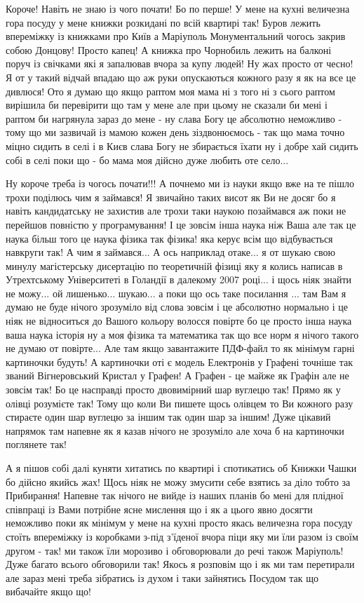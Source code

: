 Короче! Навіть не знаю із чого почати! Бо по перше! У мене на кухні величезна гора
посуду у мене книжки розкидані по всій квартирі так! Буров лежить впереміжку із книжками про Київ
а Маріуполь Монументальний чогось закрив собою Донцову! Просто капец! А книжка про Чорнобиль
лежить на балконі поруч із свічками які я запалював вчора за купу людей! Ну жах просто от чесно!
Я от у такий відчай впадаю що аж руки опускаються кожного разу я як на все це дивлюся!
Ото я думаю що якщо раптом моя мама ні з того ні з сього раптом вирішила би перевірити
що там у мене але при цьому не сказали би мені і раптом би нагрянула зараз до мене - ну слава Богу
це абсолютно неможливо - тому що ми зазвичай із мамою кожен день зіздвонюємось - так що мама 
точно міцно сидить в селі і в Києв слава Богу не збирається їхати ну і добре хай сидить собі в селі 
поки що - бо мама моя дійсно дуже любить оте село... 

Ну короче треба із чогось почати!!! А почнемо ми із науки якщо вже на те пішло
трохи поділюсь чим я займався! Я звичайно таких висот як Ви не досяг бо я
навіть кандидатську не захистив але трохи таки наукою позаймався аж поки не
перейшов повністю у програмування! І це зовсім інша наука ніж Ваша але так це
наука більш того це наука фізика так фізика! яка керує всім що відбувається
навкруги так! А чим я займався... А ось наприклад отаке... я от шукаю свою
минулу магістерську дисертацію по теоретичній фізиці яку я колись написав в
Утрехтському Університеті в Голандії в далекому 2007 році...  і щось ніяк
знайти не можу... ой лишенько... шукаю... а поки що ось таке посилання ...  там
Вам я думаю не буде нічого зрозуміло від слова зовсім і це абсолютно нормально
і це ніяк не відноситься до Вашого кольору волосся повірте бо це просто інша
наука ваша наука історія ну а моя фізика та математика так що все норм я нічого
такого не думаю от повірте...  Але там якщо завантажите ПДФ-файл то як мінімум
гарні картиночки будуть! А картиночки оті є модель Електронів у Графені точніше
так званий Вігнеровський Кристал у Графен! А Графен - це майже як Графін але не
зовсім так! Бо це насправді просто двовимірний шар вуглецю так! Прямо як у
олівці розумієте так!  Тому що коли Ви пишете щось олівцем то Ви кожного разу
стираєте один шар вуглецю за іншим так один шар за іншим!  Дуже цікавий
напрямок там напевне як я казав нічого не зрозуміло але хоча б на картиночки
поглянете так!

А я пішов собі далі куняти хитатись по квартирі і спотикатись об Книжки Чашки
бо дійсно якийсь жах!  Щось ніяк не можу змусити себе взятись за діло тобто за
Прибирання! Напевне так нічого не вийде із наших планів бо мені для плідної
співпраці із Вами потрібне ясне мислення що і як а цього явно досягти неможливо
поки як мінімум у мене на кухні просто якась величезна гора посуду стоїть
впереміжку із коробками з-під з'їденої вчора піци яку ми їли разом із своїм
другом - так! ми також їли морозиво і обговорювали до речі також Маріуполь!
Дуже багато всього обговорили так! Якось я розповім що і як ми там перетирали
але зараз мені треба зібратись із духом і таки зайнятись Посудом так що
вибачайте якщо що!


